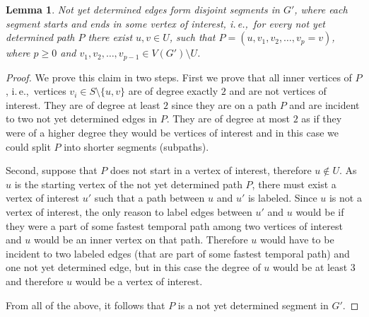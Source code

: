 \documentclass[11pt,a4paper]{article}
\newtheorem{lemma}[theorem]{Lemma}
\theoremstyle{remark}
\theoremstyle{definition}
\newcommand{\ie}{i.\,e.,\ }
\begin{document}
\begin{lemma}
    Not yet determined edges form disjoint segments in $G'$, where each segment starts and ends in some vertex of interest, 
    \ie for every not yet determined path $P$ there exist $u,v \in U$, such that $P = (u, v_1, v_2, \dots, v_p=v)$, where $p \geq 0$ and $v_1,v_2,\dots,v_{p-1} \in V(G') \setminus U$.
\end{lemma}
\begin{proof}
    We prove this claim in two steps.
    First we prove that all inner vertices of $P$, \ie vertices $v_i \in  S \setminus \{u,v\}$ are of degree exactly $2$ and are not vertices of interest. 
    They are of degree at least $2$ since they are on a path $P$ and are incident to two not yet determined edges in  $P$.
    They are of degree at most $2$ as if they were of a higher degree they would be vertices of interest and in this case we could split $P$ into shorter segments (subpaths).
    
    Second, suppose that $P$ does not start in a vertex of interest, therefore $u \notin U$. As $u$ is the starting vertex of the not yet determined path $P$, there must exist a vertex of interest $u'$ such that a path between $u$ and $u'$ is labeled.
    Since $u$ is not a vertex of interest, the only reason to label edges between $u'$ and $u$ would be if they were a part of some fastest temporal path among two vertices of interest and $u$ would be an inner vertex on that path.
    Therefore $u$ would have to be incident to two labeled edges (that are part of some fastest temporal path) and one not yet determined edge, but in this case the degree of $u$ would be at least $3$ and therefore $u$ would be a vertex of interest.

    From all of the above, it follows that $P$ is a not yet determined segment in $G'$.
\end{proof}
\end{document}
